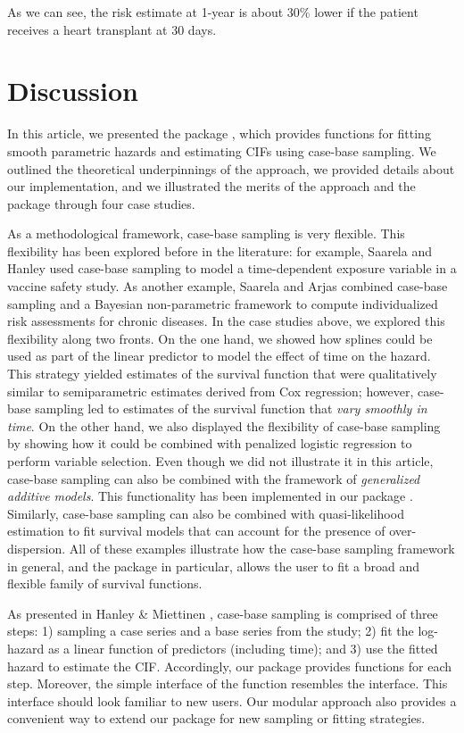 \documentclass[
]{jss}
\begin{document}
As we can see, the risk estimate at 1-year is about 30\% lower if the
patient receives a heart transplant at 30 days.

\hypertarget{discussion}{%
\section{Discussion}\label{discussion}}

In this article, we presented the  package ,
which provides functions for fitting smooth parametric hazards and
estimating CIFs using case-base sampling. We outlined the theoretical
underpinnings of the approach, we provided details about our
implementation, and we illustrated the merits of the approach and the
package through four case studies.

As a methodological framework, case-base sampling is very flexible. This
flexibility has been explored before in the literature: for example,
Saarela and Hanley \citeyearpar{saarela2015case} used case-base sampling
to model a time-dependent exposure variable in a vaccine safety study.
As another example, Saarela and Arjas \citeyearpar{saarela2015non}
combined case-base sampling and a Bayesian non-parametric framework to
compute individualized risk assessments for chronic diseases. In the
case studies above, we explored this flexibility along two fronts. On
the one hand, we showed how splines could be used as part of the linear
predictor to model the effect of time on the hazard. This strategy
yielded estimates of the survival function that were qualitatively
similar to semiparametric estimates derived from Cox regression;
however, case-base sampling led to estimates of the survival function
that \emph{vary smoothly in time}. On the other hand, we also displayed
the flexibility of case-base sampling by showing how it could be
combined with penalized logistic regression to perform variable
selection. Even though we did not illustrate it in this article,
case-base sampling can also be combined with the framework of
\emph{generalized additive models}. This functionality has been
implemented in our package . Similarly, case-base sampling
can also be combined with quasi-likelihood estimation to fit survival
models that can account for the presence of over-dispersion. All of
these examples illustrate how the case-base sampling framework in
general, and the package  in particular, allows the user
to fit a broad and flexible family of survival functions.

As presented in Hanley \& Miettinen \citeyearpar{hanley2009fitting},
case-base sampling is comprised of three steps: 1) sampling a case
series and a base series from the study; 2) fit the log-hazard as a
linear function of predictors (including time); and 3) use the fitted
hazard to estimate the CIF. Accordingly, our package provides functions
for each step. Moreover, the simple interface of the
 function resembles the  interface.
This interface should look familiar to new users. Our modular approach
also provides a convenient way to extend our package for new sampling or
fitting strategies.
\end{document}
